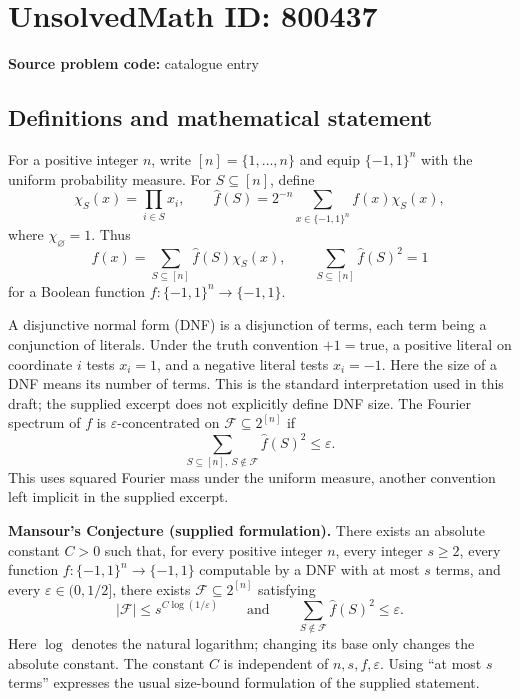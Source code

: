 \documentclass[11pt]{article}
\begin{document}
\section*{UnsolvedMath ID: 800437}
\textbf{Source problem code:} catalogue entry
\subsection{Definitions and mathematical statement}
For a positive integer \(n\), write \([n]=\{1,\ldots,n\}\) and equip \(\{-1,1\}^n\) with the uniform probability measure. For \(S\subseteq[n]\), define
\[
\chi_S(x)=\prod_{i\in S}x_i,\qquad
\widehat f(S)=2^{-n}\sum_{x\in\{-1,1\}^n}f(x)\chi_S(x),
\]
where \(\chi_\varnothing=1\). Thus
\[
f(x)=\sum_{S\subseteq[n]}\widehat f(S)\chi_S(x),
\qquad \sum_{S\subseteq[n]}\widehat f(S)^2=1
\]
for a Boolean function \(f\colon\{-1,1\}^n\to\{-1,1\}\).

A disjunctive normal form (DNF) is a disjunction of terms, each term being a conjunction of literals. Under the truth convention \(+1=\mathrm{true}\), a positive literal on coordinate \(i\) tests \(x_i=1\), and a negative literal tests \(x_i=-1\). Here the size of a DNF means its number of terms. This is the standard interpretation used in this draft; the supplied excerpt does not explicitly define DNF size. The Fourier spectrum of \(f\) is \(\varepsilon\)-concentrated on \(\mathcal F\subseteq 2^{[n]}\) if
\[
\sum_{S\subseteq[n],\ S\notin\mathcal F}\widehat f(S)^2\leq\varepsilon.
\]
This uses squared Fourier mass under the uniform measure, another convention left implicit in the supplied excerpt.

\textbf{Mansour's Conjecture (supplied formulation).}
There exists an absolute constant \(C>0\) such that, for every positive integer \(n\), every integer \(s\geq2\), every function \(f\colon\{-1,1\}^n\to\{-1,1\}\) computable by a DNF with at most \(s\) terms, and every \(\varepsilon\in(0,1/2]\), there exists \(\mathcal F\subseteq 2^{[n]}\) satisfying
\[
|\mathcal F|\leq s^{C\log(1/\varepsilon)}
\qquad\text{and}\qquad
\sum_{S\notin\mathcal F}\widehat f(S)^2\leq\varepsilon.
\]
Here \(\log\) denotes the natural logarithm; changing its base only changes the absolute constant. The constant \(C\) is independent of \(n,s,f,\varepsilon\). Using ``at most \(s\) terms'' expresses the usual size-bound formulation of the supplied statement.
\end{document}
